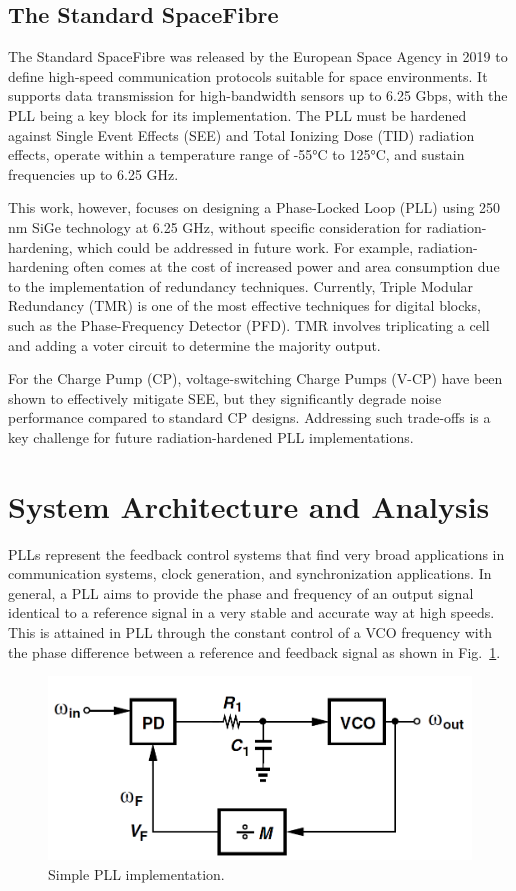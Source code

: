 \documentclass[lettersize,journal]{IEEEtran}
\begin{document}
\subsection{The Standard SpaceFibre}

The Standard SpaceFibre was released by the European Space Agency in 2019 to define high-speed communication protocols suitable for space environments. It supports data transmission for high-bandwidth sensors up to 6.25 Gbps, with the PLL being a key block for its implementation. The PLL must be hardened against Single Event Effects (SEE) and Total Ionizing Dose (TID) radiation effects, operate within a temperature range of -55°C to 125°C, and sustain frequencies up to 6.25 GHz.

This work, however, focuses on designing a Phase-Locked Loop (PLL) using 250 nm SiGe technology at 6.25 GHz, without specific consideration for radiation-hardening, which could be addressed in future work. For example, radiation-hardening often comes at the cost of increased power and area consumption due to the implementation of redundancy techniques. Currently, Triple Modular Redundancy (TMR) is one of the most effective techniques for digital blocks, such as the Phase-Frequency Detector (PFD). TMR involves triplicating a cell and adding a voter circuit to determine the majority output.

For the Charge Pump (CP), voltage-switching Charge Pumps (V-CP) have been shown to effectively mitigate SEE, but they significantly degrade noise performance compared to standard CP designs. Addressing such trade-offs is a key challenge for future radiation-hardened PLL implementations.

\section{System Architecture and Analysis}
\label{sec:system_architecture_and_analysis}
PLLs represent the feedback control systems that find very broad applications in communication systems, clock generation, and synchronization applications. In general, a PLL aims to provide the phase and frequency of an output signal identical to a reference signal in a very stable and accurate way at high speeds. This is attained in PLL through the constant control of a VCO frequency with the phase difference between a reference and feedback signal as shown in Fig.~\ref{fig:simple_pll}.

\begin{figure}[!h]
    \centering
    \includegraphics[width=0.75\linewidth]{images/intro_system_level/simple_pll.png}
    \caption{Simple PLL implementation.}
    \label{fig:simple_pll}
\end{figure}
\end{document}
